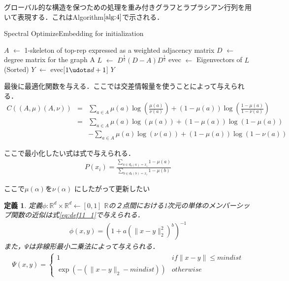 \documentclass{jsarticle}
\newtheorem{dfn}{定義}
\begin{document}
グローバル的な構造を保つための処理を重み付きグラフとラプラシアン行列を用いて表現する．これはAlgorithm$\ref{alg:4}$で示される．
\begin{algorithm}
  \caption{Spectral OptimizeEmbedding for initialization}
  \label{alg:4}
  \begin{algorithmic}
    \State $A$ $\leftarrow$ 1-skeleton of top-rep expressed as a weighted adjacency matrix
    \State $D$ $\leftarrow$ degree matrix for the graph A
    \State $L$ $\leftarrow$ $D^\frac{1}{2}(D-A)D^\frac{1}{2}$
    \State evec $\leftarrow$ Eigenvectors of $L$ (Sorted)
    \State $Y$ $\leftarrow$ evec[$1 \udots d+1$]
    \State \Return $Y$
  \end{algorithmic}
\end{algorithm}

最後に最適化関数を与える．ここでは交差情報量を使うことによって与えられる．
\begin{eqnarray}
  C((A,\mu)(A,\nu))&=&\sum_{a \in A} \mu (a) \log (\frac{\mu(a)}{\nu(a)}) + (1-\mu (a)) \log (\frac{1-\mu(a)}{1-\nu(a)}) \\
  &=&\sum_{a \in A} \mu (a) \log (\mu(a)) + (1-\mu (a)) \log (1-\mu(a)) \nonumber \\
  &&-\sum_{a \in A} \mu (a) \log (\nu(a)) + (1-\mu (a)) \log (1-\nu(a)) 
\end{eqnarray}

ここで最小化したい式は式で与えられる．
\begin{eqnarray}
P(x_i)=\frac{\sum_{a \in d_0(a)=x_i} 1 - \mu (a)}{\sum_{b \in d_0(b)=x_i} 1 - \mu (b)}
\end{eqnarray}

ここで$\mu(\alpha)$を$\nu(\alpha)$ にしたがって更新したい

\begin{dfn}
定義$\phi:\mathbb{R}^d\times\mathbb{R}^d \leftarrow [0,1]$
$\mathbb{R}$の２点間における1次元の単体のメンバーシップ関数の近似は式\ref{eq:def11_1}で与えられる．
\begin{eqnarray}
  \label{eq:def11_1}
  \phi(x,y)=(1+a(\|x-y\|_2^2)^b)^{-1}
\end{eqnarray}
また，$\Psi$は非線形最小二乗法によって与えられる．
\begin{eqnarray}
  \Psi(x , y)= \left\{ \begin{array}{ll}
    1  & if\| x-y\| \leq mindist \\
    \exp(-(\| x-y \|_2 - {mindist})) & otherwise
  \end{array} \right.
\end{eqnarray}

\end{dfn}
\end{document}
